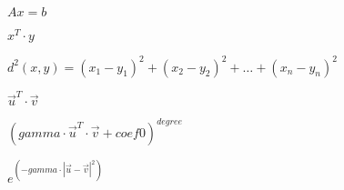 \documentclass{article}
\begin{document}
$Ax = b$
\pagebreak

$x^T \cdot y$
\pagebreak

$d^2(x, y) = (x_1 - y_1)^2 + (x_2 - y_2)^2 + \dots + (x_n - y_n)^2$
\pagebreak

$\vec{u}^T \cdot \vec{v}$
\pagebreak

$(gamma \cdot \vec{u}^T \cdot \vec{v} + coef0)^{degree}$
\pagebreak

$e^{(-gamma \cdot |\vec{u} - \vec{v}|^2)}$
\pagebreak
\end{document}
